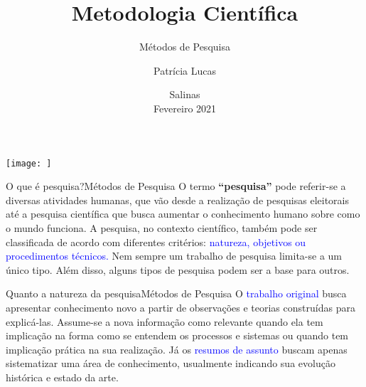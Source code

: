 \documentclass[t]{beamer}
\title[]{Metodologia Científica}
\subtitle[]{Métodos de Pesquisa}
\author[]{Patrícia Lucas\\{\footnotesize }}
\institute{Bacharelado em Sistemas de Informação \\ IFNMG  - Campus Salinas}
\date{\scriptsize Salinas\\Fevereiro 2021}
\begin{document}
\begin{frame}

\begin{center}
\texttt{[image: ]}
\end{center}
  \titlepage
\end{frame}

\begin{ftst}{O que é pesquisa?}{Métodos de Pesquisa}
\vone
\justifying
O termo \textbf{“pesquisa”} pode referir-se a diversas atividades humanas, que vão desde a realização de pesquisas eleitorais até a pesquisa científica que busca aumentar o conhecimento humano sobre como o mundo funciona.
\vone
A pesquisa, no contexto científico, também pode ser classificada de acordo com diferentes critérios: \textcolor{blue}{natureza, objetivos ou procedimentos técnicos.} 
\vone
Nem sempre um trabalho de pesquisa limita-se a um único tipo. Além disso, alguns tipos de pesquisa podem ser a base para outros.

\end{ftst}


\begin{ftst}{Quanto a natureza da pesquisa}{Métodos de Pesquisa}
\vone
\justifying
O \textcolor{blue}{trabalho original} busca apresentar conhecimento novo a partir de observações e teorias construídas para explicá-las. Assume-se a nova informação como relevante quando ela tem implicação na forma como se entendem os processos e sistemas ou quando tem implicação prática na sua realização.
\vone
Já os \textcolor{blue}{resumos de assunto} buscam apenas sistematizar uma área de conhecimento, usualmente indicando sua evolução histórica e estado da arte.

\end{ftst}

\end{document}
